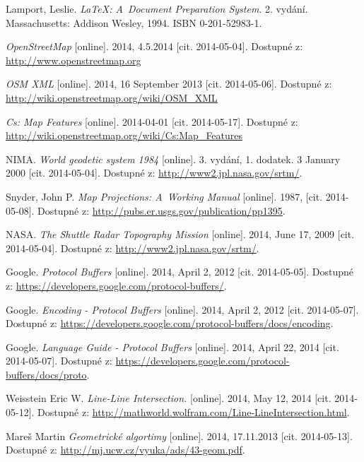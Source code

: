 
\def\bibname{Seznam použité literatury}
\begin{thebibliography}{99}
\addcontentsline{toc}{chapter}{\bibname}

  {\sc Lamport,} Leslie.
  \emph{\LaTeX: A~Document Preparation System}.
  2. vydání.
  Massachusetts: Addison Wesley, 1994.
  ISBN 0-201-52983-1.

	\emph{OpenStreetMap} [online]. 
	2014, 4.5.2014 [cit. 2014-05-04]. 
	Dostupné z: \url{http://www.openstreetmap.org}

	\emph{OSM XML} [online]. 
	2014, 16 September 2013 [cit. 2014-05-06]. 
	Dostupné z: \url{http://wiki.openstreetmap.org/wiki/OSM_XML}

	\emph{Cs: Map Features} [online]. 
	2014-04-01 [cit. 2014-05-17]. 
	Dostupné z: \url{http://wiki.openstreetmap.org/wiki/Cs:Map_Features}

	{\sc NIMA.}
	\emph{World geodetic system 1984} [online]. 
	3. vydání, 1. dodatek.
	3 January 2000 [cit. 2014-05-04]. 
	Dostupné z: \url{http://www2.jpl.nasa.gov/srtm/}.

	{\sc Snyder,} John P.
	\emph{Map Projections: A~Working Manual} [online]. 
	1987, [cit. 2014-05-08]. 
	Dostupné z: \url{http://pubs.er.usgs.gov/publication/pp1395}.

	{\sc NASA.}
	\emph{The Shuttle Radar Topography Mission} [online]. 
	2014, June 17, 2009 [cit. 2014-05-04]. 
	Dostupné z: \url{http://www2.jpl.nasa.gov/srtm/}.

	{\sc Google.}
	\emph{Protocol Buffers} [online]. 
	2014, April 2, 2012 [cit. 2014-05-05]. 
	Dostupné z: \url{https://developers.google.com/protocol-buffers/}.

	{\sc Google.}
	\emph{Encoding - Protocol Buffers} [online]. 
	2014, April 2, 2012 [cit. 2014-05-07]. 
	Dostupné z: \url{https://developers.google.com/protocol-buffers/docs/encoding}.

	{\sc Google.}
	\emph{Language Guide - Protocol Buffers} [online]. 
	2014, April 22, 2014 [cit. 2014-05-07]. 
	Dostupné z:	\url{https://developers.google.com/protocol-buffers/docs/proto}.

	{\sc Weisstein} Eric W.
	\emph{Line-Line Intersection.} [online]. 
	2014, May 12, 2014 [cit. 2014-05-12]. 
	Dostupné z:	\url{http://mathworld.wolfram.com/Line-LineIntersection.html}.

	{\sc Mareš} Martin
	\emph{Geometrické algortimy} [online]. 
	2014, 17.11.2013 [cit. 2014-05-13]. 
	Dostupné z:	\url{http://mj.ucw.cz/vyuka/ads/43-geom.pdf}.
	

\end{thebibliography}
